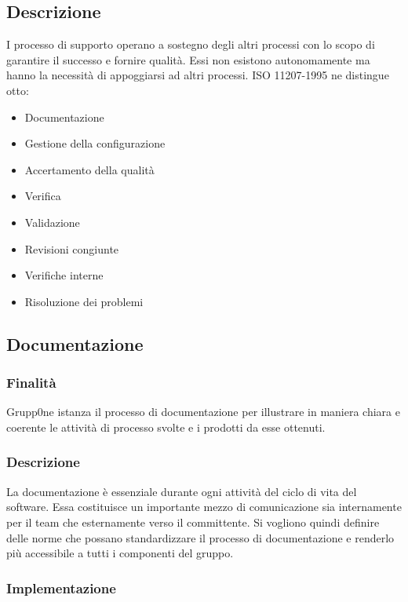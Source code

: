 \documentclass[../norme-di-progetto.tex]{subfiles}
\begin{document}
\subsection{Descrizione}
\label{sub:descrizione}
I processo di supporto operano a sostegno degli altri processi con lo scopo di garantire il successo e fornire qualità. Essi non esistono autonomamente ma hanno la necessità di appoggiarsi ad altri processi. ISO 11207-1995 ne distingue otto:
\begin{itemize}
	\item Documentazione
	\item Gestione della configurazione
	\item Accertamento della qualità
	\item Verifica
	\item Validazione
	\item Revisioni congiunte
	\item Verifiche interne
	\item Risoluzione dei problemi
\end{itemize} 
\subsection{Documentazione}
\label{sub:documentazione}
\subsubsection{Finalità}
\label{subs:finalità}
Grupp0ne istanza il processo di documentazione per illustrare in maniera chiara e coerente le attività di processo svolte e i prodotti da esse ottenuti.
\subsubsection{Descrizione}
\label{subs:descrizione}
La documentazione è essenziale durante ogni attività del ciclo di vita del software. Essa costituisce un importante mezzo di comunicazione sia internamente per il team che esternamente verso il committente. Si vogliono quindi definire delle norme che possano standardizzare il processo di documentazione e renderlo più accessibile a tutti i componenti del gruppo.
\subsubsection{Implementazione}
\label{subs:implementazione}
\end{document}
